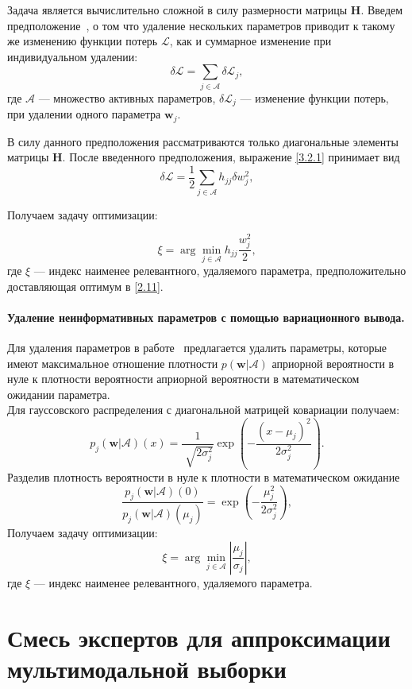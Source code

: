 Задача является вычислительно сложной в силу размерности матрицы \textbf{H}. Введем предположение~\cite{cun1990}, о том что удаление нескольких параметров приводит к такому же изменению функции потерь $\mathcal{L}$, как и суммарное изменение при индивидуальном удалении:
\[
\label{3.2.3}
\delta \mathcal{L} = \sum_{j\in \mathcal{A}} \delta \mathcal{L}_j,
\]
где $\mathcal{A}$ --- множество активных параметров, $\delta\mathcal{L}_j$ --- изменение функции потерь, при удалении одного параметра $\textbf{w}_j$.

В силу данного предположения рассматриваются только диагональные элементы матрицы \textbf{H}. После введенного предположения, выражение \eqref{3.2.1} принимает вид
\[
\label{3.2.4}
\delta \mathcal{L} = \frac{1}{2} \sum_{j\in \mathcal{A}} h_{jj}\delta w_j^2, 
\]

Получаем задачу оптимизации:

\[
\label{3.2.5}
\xi = \arg\min_{j\in \mathcal{A}} h_{jj}\frac{w_j^2}{2},
\]
где $\xi$ --- индекс наименее релевантного, удаляемого параметра, предположительно доставляющая оптимум в \eqref{2.11}.

\paragraph{Удаление неинформативных параметров с помощью вариационного вывода.}
Для удаления параметров в работе~\cite{graves2011} предлагается удалить параметры, которые имеют максимальное отношение плотности $p(\textbf{w}|\mathcal{A})$ априорной вероятности в нуле к плотности вероятности априорной вероятности в математическом ожидании параметра.\\
Для гауссовского распределения с диагональной матрицей ковариации получаем:
\[
\label{3.3.1}
p_j(\textbf{w}|\mathcal{A})(x) = \frac{1}{\sqrt[]{2\sigma_j^2}}\exp({-\frac{(x-\mu_j)^2}{2\sigma_j^2}}).
\]
Разделив плотность вероятности в нуле к плотности в математическом ожидание
\[
\label{3.3.2}
\frac{p_j(\textbf{w}|\mathcal{A})(0)}{p_j(\textbf{w}|\mathcal{A})(\mu_j)}= \exp({-\frac{\mu_j^2}{2\sigma_j^2}}),
\]
Получаем задачу оптимизации:
\[
\label{3.3.3}
\xi = \arg\min_{j\in \mathcal{A}} \left|\frac{\mu_j}{\sigma_j}\right|,
\]
где $\xi$ --- индекс наименее релевантного, удаляемого параметра.

\section{Смесь экспертов для аппроксимации мультимодальной выборки }

